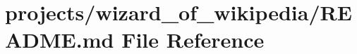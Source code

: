 \hypertarget{projects_2wizard__of__wikipedia_2README_8md}{}\section{projects/wizard\+\_\+of\+\_\+wikipedia/\+R\+E\+A\+D\+ME.md File Reference}
\label{projects_2wizard__of__wikipedia_2README_8md}
